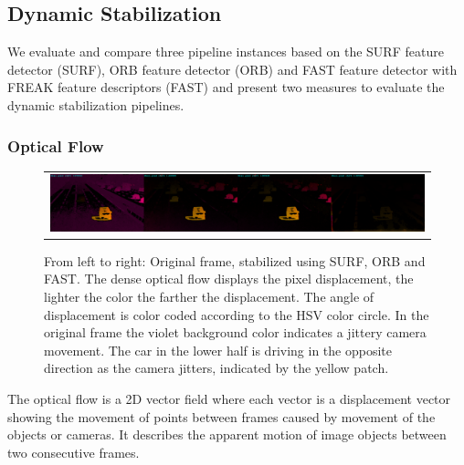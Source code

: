 \subsection{Dynamic Stabilization}
\label{sec:evaluation_dynamic_stabilization}
We evaluate and compare three pipeline instances based on the SURF \cite{bay10.1007/11744023_32,opencv_library} feature detector (SURF), 
ORB \cite{rublee6126544, opencv_library} feature detector (ORB) and FAST \cite{Ghahremani_2021,opencv_library} feature detector with FREAK \cite{alahi6247715,opencv_library} feature descriptors (FAST) 
and present two measures to evaluate the dynamic stabilization pipelines.


\subsubsection{Optical Flow}
\label{sec:evaluation_dynamic_stabilization_optical_flow}
\begin{figure}[!ht]
    \centering
    \begin{tabular}{c}
      \includegraphics[width=0.95\linewidth]{images/frame_1317_cropped.png}    
    \end{tabular}
    \caption{
        From left to right: Original frame, stabilized using SURF, ORB and FAST.
        The dense optical flow displays the pixel displacement, the lighter the color the farther the displacement. 
        The angle of displacement is color coded according to the HSV color circle.  
        In the original frame the violet background color indicates a jittery camera movement. 
        The car in the lower half is driving in the opposite direction as the camera jitters, indicated by the yellow patch. 
    }
    \label{fig:optical_flow_example}
\end{figure}

The optical flow is a 2D vector field where each vector is a displacement vector showing the movement of points between frames caused by movement of the objects or cameras.
It describes the apparent motion of image objects between two consecutive frames. 

